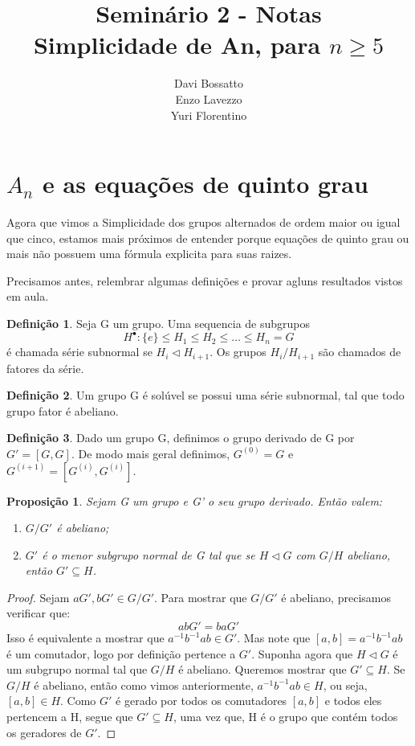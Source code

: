 \documentclass[a4paper,12pt]{article}
\title{\Large \bfseries Seminário 2 - Notas\\Simplicidade de An, para $n \geq 5$}
\author{Davi Bossatto \\ Enzo Lavezzo \\ Yuri Florentino \\}
\date{}
\newtheorem*{proposition}{Proposição}
\theoremstyle{definition}
\newtheorem{definition}{Definição}
\theoremstyle{remark}
\begin{document}
\maketitle

\section{$A_n$ e as equações de quinto grau}

Agora que vimos a Simplicidade dos grupos alternados de ordem maior ou igual que cinco, estamos mais próximos de entender porque equações de quinto grau ou mais não possuem uma 
fórmula explicita para suas raizes. 

Precisamos antes, relembrar algumas definições e provar agluns resultados vistos em aula.

\begin{definition}
    Seja G um grupo. Uma sequencia de subgrupos
    \[H^{\bullet}: \{e\} \leq H_1 \leq H_2 \leq \dots \leq H_n = G\]
    é chamada série subnormal se $H_i \vartriangleleft H_{i+1}$. 
    Os grupos $H_i/H_{i+1}$ são chamados de fatores da série.
\end{definition}

\begin{definition}
    Um grupo G é solúvel se possui uma série subnormal, tal que todo grupo fator é abeliano.
\end{definition}

\begin{definition}
    Dado um grupo G, definimos o grupo derivado de G por $G' = [G, G]$.
    De modo mais geral definimos, $G^{(0)} = G$ e $G^{(i+1)} = [G^{(i)}, G^{(i)}]$. 
\end{definition}

\begin{proposition}
    Sejam G um grupo e G' o seu grupo derivado. Então valem:
    \begin{enumerate}
        \item $G/G'$ é abeliano;
        \item $G'$ é o menor subgrupo normal de G tal que se $H \lhd G$ com $G/H$ abeliano, então $G' \subseteq  H$.
    \end{enumerate}
\end{proposition}

\begin{proof}
    Sejam $aG', bG' \in G/G'$. Para mostrar que $G/G'$ é abeliano, precisamos verificar que:
    \[abG' = baG'\]
    Isso é equivalente a mostrar que $a^{-1}b^{-1}ab \in G'$. Mas note que $[a, b] = a^{-1}b^{-1}ab$ é um comutador,
    logo por definição pertence a $G'$.
    Suponha agora que $H \vartriangleleft G$ é um subgrupo normal tal que $G/H$ é abeliano. Queremos mostrar que $G' \subseteq H$.
    Se $G/H$ é abeliano, então como vimos anteriormente, $ a^{-1}b^{-1}ab \in H$, ou seja, $[a, b] \in H$.
    Como $G'$ é gerado por todos os comutadores $[a, b]$ e todos eles pertencem a H, segue que $G' \subseteq H$, uma vez que, 
    H é o grupo que contém todos os geradores de $G'$.
\end{proof}
\end{document}

